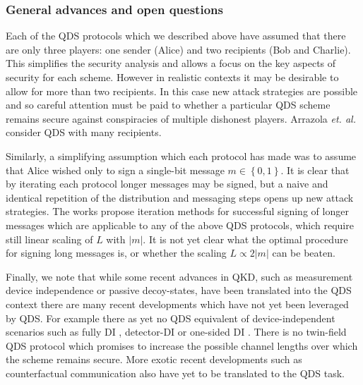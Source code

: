 \subsubsection*{General advances and open questions}
Each of the QDS protocols which we described above have assumed that there are only three players: one sender (Alice) and two recipients (Bob and Charlie). This simplifies the security analysis and allows a focus on the key aspects of security for each scheme. However in realistic contexts it may be desirable to allow for more than two recipients. In this case new attack strategies are possible and so careful attention must be paid to whether a particular QDS scheme remains secure against conspiracies of multiple dishonest players. Arrazola \emph{et. al.} \cite{Arrazola2015} consider QDS with many recipients. %

Similarly, a simplifying assumption which each protocol has made was to assume that Alice wished only to sign a single-bit message $m \in \left\{0, 1\right\}$. It is clear that by iterating each protocol longer messages may be signed, but a naive and identical repetition of the distribution and messaging steps opens up new attack strategies. The works \cite{Wang2015, Wang2017} propose iteration methods for successful signing of longer messages which are applicable to any of the above QDS protocols, which require still linear scaling of $L$ with $\left|m\right|$. It is not yet clear what the optimal procedure for signing long messages is, or whether the scaling $L \propto 2 \left|m\right|$ can be beaten. %

Finally, we note that while some recent advances in QKD, such as measurement device independence or passive decoy-states, have been translated into the QDS context there are many recent developments which have not yet been leveraged by QDS. For example there as yet no QDS equivalent of device-independent scenarios such as fully DI \cite{Vazirani2014}, detector-DI \cite{Lim2014, Boaron2014} or one-sided DI \cite{Walk2016a}. There is no twin-field \cite{Curty2018} QDS protocol which promises to increase the possible channel lengths over which the scheme remains secure. More exotic recent developments such as counterfactual communication \cite{Noh2009, Salih2013a, Hance2019, Vaidman2019} also have yet to be translated to the QDS task. 

